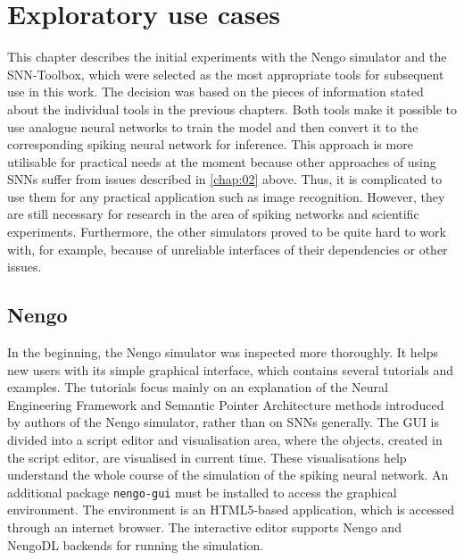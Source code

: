 \chapter{Exploratory use cases} \label{chap:05}

This chapter describes the initial experiments with the Nengo simulator and the SNN-Toolbox, which were selected as the most appropriate tools for subsequent use in this work. The decision was based on the pieces of information stated about the individual tools in the previous chapters. Both tools make it possible to use analogue neural networks to train the model and then convert it to the corresponding spiking neural network for inference. This approach is more utilisable for practical needs at the moment because other approaches of using SNNs suffer from issues described in \cref{chap:02} above. Thus, it is complicated to use them for any practical application such as image recognition. However, they are still necessary for research in the area of spiking networks and scientific experiments. Furthermore, the other simulators proved to be quite hard to work with, for example, because of unreliable interfaces of their dependencies or other issues.

\section{Nengo}
In the beginning, the Nengo simulator was inspected more thoroughly. It helps new users with its simple graphical interface, which contains several tutorials and examples. The tutorials focus mainly on an explanation of the Neural Engineering Framework and Semantic Pointer Architecture methods introduced by authors of the Nengo simulator, rather than on SNNs generally. The GUI is divided into a script editor and visualisation area, where the objects, created in the script editor, are visualised in current time. These visualisations help understand the whole course of the simulation of the spiking neural network. An additional package \texttt{nengo-gui} must be installed to access the graphical environment. The environment is an HTML5-based application, which is accessed through an internet browser. The interactive editor supports Nengo and NengoDL backends for running the simulation. 

